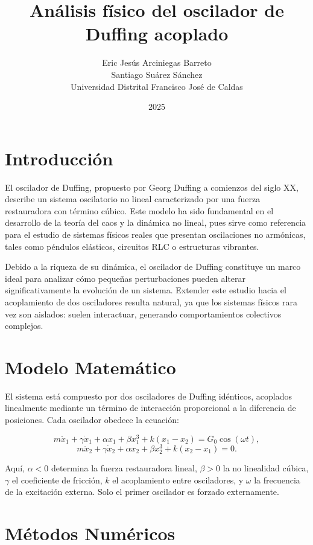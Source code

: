 \documentclass[12pt,a4paper]{article}
\title{\textbf{Análisis físico del oscilador de Duffing acoplado}}
\author{
Eric Jesús Arciniegas Barreto \\ 
Santiago Suárez Sánchez \\ [0.5em]
\small Universidad Distrital Francisco José de Caldas
}
\date{2025}
\begin{document}
\maketitle

\section{Introducción}

El oscilador de Duffing, propuesto por Georg Duffing a comienzos del siglo XX, describe un sistema oscilatorio no lineal caracterizado por una fuerza restauradora con término cúbico. Este modelo ha sido fundamental en el desarrollo de la teoría del caos y la dinámica no lineal, pues sirve como referencia para el estudio de sistemas físicos reales que presentan oscilaciones no armónicas, tales como péndulos elásticos, circuitos RLC o estructuras vibrantes.

Debido a la riqueza de su dinámica, el oscilador de Duffing constituye un marco ideal para analizar cómo pequeñas perturbaciones pueden alterar significativamente la evolución de un sistema. Extender este estudio hacia el acoplamiento de dos osciladores resulta natural, ya que los sistemas físicos rara vez son aislados: suelen interactuar, generando comportamientos colectivos complejos.

\section{Modelo Matemático}

El sistema está compuesto por dos osciladores de Duffing idénticos, acoplados linealmente mediante un término de interacción proporcional a la diferencia de posiciones. Cada oscilador obedece la ecuación:

\begin{equation}
m\ddot{x}_1 + \gamma \dot{x}_1 + \alpha x_1 + \beta x_1^3 + k(x_1 - x_2) = G_0 \cos(\omega t),
\end{equation}
\begin{equation}
m\ddot{x}_2 + \gamma \dot{x}_2 + \alpha x_2 + \beta x_2^3 + k(x_2 - x_1) = 0.
\end{equation}

Aquí, $\alpha < 0$ determina la fuerza restauradora lineal, $\beta > 0$ la no linealidad cúbica, $\gamma$ el coeficiente de fricción, $k$ el acoplamiento entre osciladores, y $\omega$ la frecuencia de la excitación externa. Solo el primer oscilador es forzado externamente.

\section{Métodos Numéricos}
\end{document}
